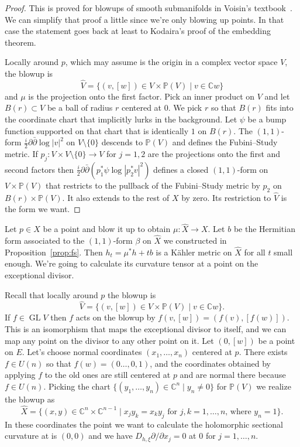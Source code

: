 \documentclass[10pt,a4paper]{amsart}
\newcommand{\kk}[1]{\mathbb{#1}}
\def\fs{b}
\DeclareMathOperator{\GL}{GL}
\def\hsc{holomorphic sectional curvature}
\def\bl#1{\widehat{#1}}
\begin{document}
\begin{proof}
This is proved for blowups of smooth submanifolds in
Voisin's textbook~\cite{voisin2002theorie}.
We can simplify that proof a little since we're only blowing up points.
In that case the statement goes back at least to Kodaira's proof of the
embedding theorem.


Locally around $p$, which may assume is the origin in a complex vector space
$V$, the blowup is
$$
\bl V
= \{ (v,[w]) \in V \times \kk P(V) \mid v \in \kk C w \}
$$
and $\mu$ is the projection onto the first factor.
Pick an inner product on $V$ and let $B(r) \subset V$ be a ball of radius $r$
centered at $0$.
We pick $r$ so that $B(r)$ fits into the coordinate chart that implicitly lurks
in the background.
Let $\psi$ be a bump function supported on that chart that is identically $1$
on $B(r)$.
The $(1,1)$-form $\frac i2 \partial\bar\partial \log |v|^2$ on $V \setminus
\{0\}$ descends to $\kk P(V)$ and defines the Fubini--Study metric.
If $p_j : V \times V \setminus \{0\} \to V$ for $j = 1,2$ are the projections
onto the first and second factors then
$\frac i2 \partial \bar\partial (p_1^*\psi \log |p_2^*v|^2)$
defines a closed $(1,1)$-form on $V \times \kk P(V)$ that restricts to the
pullback of the Fubini--Study metric by $p_2$ on $B(r) \times \kk P(V)$.
It also extends to the rest of $X$ by zero.
Its restriction to $\bl V$ is the form we want.
\end{proof}




Let $p \in X$ be a point and blow it up to obtain $\mu : \bl X \to X$.
Let $\fs$ be the Hermitian form associated to the $(1,1)$-form $\beta$ on $\bl X$
we constructed in Proposition~\ref{prop:fs}.
Then $h_t = \mu^*h + t \fs$ is a K\"ahler metric on $\bl X$ for all $t$ small
enough.
We're going to calculate its curvature tensor at a point on the exceptional
divisor.

Recall that locally around $p$ the blowup is
$$
\bl V
= \{ (v,[w]) \in V \times \kk P(V) \mid v \in \kk C w \}.
$$
If $f \in \GL V$ then $f$ acts on the blowup by $f(v, [w]) = (f(v), [f(w)])$.
This is an isomorphism that maps the exceptional divisor to itself, and we can
map any point on the divisor to any other point on it.
Let $(0, [w])$ be a point on $E$.
Let's choose normal coordinates $(x_1,\ldots,x_n)$ centered at $p$.
There exists $f \in U(n)$ so that $f(w) = (0 \ldots, 0, 1)$, and the
coordinates obtained by applying $f$ to the old ones are still centered at $p$
and are normal there because $f \in U(n)$.
Picking the chart $\{(y_1, \ldots, y_n) \in \kk C^n \mid y_n \not= 0 \}$ for
$\kk P(V)$
we realize the blowup as
$$
\bl X
= \{ (x,y) \in \kk C^n \times \kk C^{n-1}
\mid x_j y_k = x_k y_j \text{ for $j,k = 1,\ldots,n$, where $y_n = 1$}  \}.
$$
In these coordinates the point we want to calculate the \hsc{} at is $(0,0)$
and we have $D_{h,\xi} \partial / \partial x_j = 0$ at $0$ for $j = 1, \ldots, n$.
\end{document}
